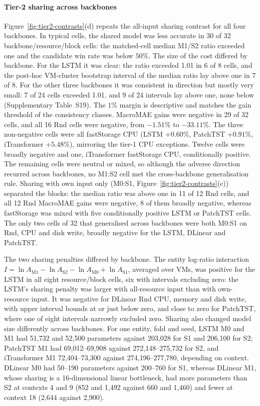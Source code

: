 \documentclass[5p,twocolumn]{elsarticle}
\begin{document}
\paragraph{Tier-2 sharing across backbones}
Figure~\ref{fig:tier2-contrasts}(d) repeats the all-input sharing contrast
for all four backbones. In typical cells, the shared model was less accurate
in 30 of 32 backbone/resource/block cells: the matched-cell median M1/S2
ratio exceeded one and the candidate win rate was below $50\%$. The size of
the cost differed by backbone. For the LSTM it was clear: the ratio exceeded
1.01 in 6 of 8 cells, and the post-hoc VM-cluster bootstrap interval of the
median ratio lay above one in 7 of 8. For the other three backbones it was
consistent in direction but mostly very small: 7 of 24 cells exceeded 1.01,
and 9 of 24 intervals lay above one, none below (Supplementary Table~S19).
The $1\%$ margin is descriptive and matches the gain threshold of the
consistency classes. MacroMAE
gains were negative in 29 of 32 cells, and all 16 Rnd cells were negative,
from $-1.51\%$ to $-33.11\%$. The three non-negative cells were
all fastStorage CPU (LSTM $+0.60\%$, PatchTST $+0.91\%$, iTransformer
$+5.48\%$), mirroring the tier-1 CPU exceptions. Twelve cells were broadly
negative and one, iTransformer fastStorage CPU, conditionally positive. The
remaining cells were neutral or mixed, so although the adverse direction
recurred across backbones, no M1:S2 cell met the cross-backbone
generalisation rule. Sharing with own input only (M0:S1,
Figure~\ref{fig:tier2-contrasts}(c)) separated the blocks: the median ratio
was above one in 11 of 12 Rnd cells, and all 12 Rnd MacroMAE gains were
negative, 8 of them broadly negative, whereas fastStorage was mixed with
five conditionally positive LSTM or PatchTST cells. The only two cells of
32 that generalised across backbones were both M0:S1 on Rnd, CPU and disk
write, broadly negative for the LSTM, DLinear and PatchTST.

The two sharing penalties differed by backbone. The entity log-ratio
interaction $I=\ln A_{\mathrm{M1}}-\ln A_{\mathrm{S2}}-\ln A_{\mathrm{M0}}
+\ln A_{\mathrm{S1}}$, averaged over VMs, was positive for the LSTM in all eight
resource/block cells, six with intervals excluding zero: the LSTM's sharing
penalty was larger with all-resource input than with own-resource input. It
was negative for DLinear Rnd CPU, memory and disk write, with upper interval
bounds at or just below zero, and close to zero for PatchTST, where one of
eight intervals narrowly excluded zero. Sharing also changed model size
differently across backbones. For one entity, fold and seed, LSTM M0 and M1
had 51{,}732 and 52{,}500 parameters against 203{,}028 for S1 and 206{,}100
for S2; PatchTST M1 had 69{,}012--69{,}908 against 272{,}148--275{,}732 for
S2, and iTransformer M1 72{,}404--73{,}300 against 274{,}196--277{,}780,
depending on context. DLinear M0 had 50--190 parameters against 200--760 for
S1, whereas DLinear M1, whose sharing is a 16-dimensional linear bottleneck,
had more parameters than S2 at contexts 4 and 9 (852 and 1{,}492 against 660
and 1{,}460) and fewer at context 18 (2{,}644 against 2{,}900).
\end{document}

